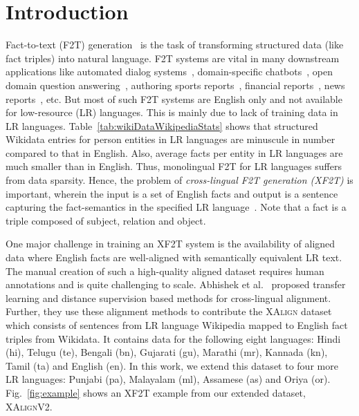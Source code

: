\documentclass[runningheads]{llncs}
\newcommand{\data}{\textsc{XAlignV2}}
\begin{document}
\section{Introduction}
Fact-to-text (F2T) generation~\cite{reiter1997building} is the task of transforming structured data (like fact triples) into natural language. F2T systems are vital in many downstream applications like automated dialog systems~\cite{wen2016multi}, domain-specific chatbots~\cite{novikova2017e2e}, open domain question answering~\cite{chen2020kgpt}, authoring sports reports~\cite{chen2008learning}, financial reports~\cite{plachouras2016interacting}, news reports~\cite{leppanen2017data}, etc. But most of such F2T systems are English only and not available for low-resource (LR) languages. This is mainly due to lack of training data in LR languages. Table~\ref{tab:wikiDataWikipediaStats} shows that structured Wikidata entries for person entities in LR languages are minuscule in number compared to that in English. Also, average facts per entity in LR languages are much smaller than in English. Thus, monolingual F2T for LR languages suffers from data sparsity. Hence,
the problem of \emph{cross-lingual F2T generation (XF2T)} is important, wherein the input is a set of English facts and output is a  sentence capturing the fact-semantics in the specified LR language~\cite{abhishek2022xalign}. Note that a fact is a triple composed of subject, relation and object.

One major challenge in training an XF2T system is the availability of aligned data where English facts are  well-aligned with semantically equivalent LR text. The manual creation of such a high-quality aligned dataset requires human annotations and is quite challenging to scale.
Abhishek et al.~\cite{abhishek2022xalign} proposed transfer learning and distance supervision based methods for cross-lingual alignment. Further, they use these alignment methods to contribute the \textsc{XAlign} dataset which consists of sentences from LR language Wikipedia mapped to English fact triples from Wikidata. It contains data for the following eight languages: Hindi (hi), Telugu (te), Bengali (bn), Gujarati (gu), Marathi (mr), Kannada (kn), Tamil (ta) and English (en). In this work, we extend this dataset to four more LR languages: Punjabi (pa), Malayalam (ml), Assamese (as) and Oriya (or). Fig.~\ref{fig:example} shows an XF2T example from our extended dataset, \data{}. 
\end{document}
